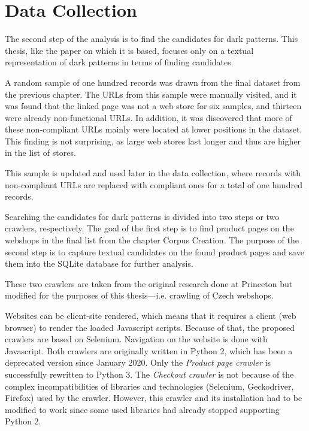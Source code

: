 \chapter{Data Collection}
    The second step of the analysis is to find the candidates for dark patterns. This thesis, like the paper on which it is based\cite{dark-patterns-at-scale}, focuses only on a textual representation of dark patterns in terms of finding candidates.

    A random sample of one hundred records was drawn from the final dataset from the previous chapter. The URLs from this sample were manually visited, and it was found that the linked page was not a web store for six samples, and thirteen were already non-functional URLs. In addition, it was discovered that more of these non-compliant URLs mainly were located at lower positions in the dataset. This finding is not surprising, as large web stores last longer and thus are higher in the list of stores.

    This sample is updated and used later in the data collection, where records with non-compliant URLs are replaced with compliant ones for a total of one hundred records.

    Searching the candidates for dark patterns is divided into two steps or two crawlers, respectively. The goal of the first step is to find product pages on the webshops in the final list from the chapter Corpus Creation. The purpose of the second step is to capture textual candidates on the found product pages and save them into the SQLite database for further analysis.

    These two crawlers are taken from the original research done at Princeton but modified for the purposes of this thesis---i.e. crawling of Czech webshops.

    Websites can be client-site rendered, which means that it requires a client (web browser) to render the loaded Javascript scripts. Because of that, the proposed crawlers are based on Selenium. Navigation on the website is done with Javascript.  Both crawlers are originally written in Python 2, which has been a deprecated version since January 2020. Only the \emph{Product page crawler} is successfully rewritten to Python 3. The \emph{Checkout crawler} is not because of the complex incompatibilities of libraries and technologies (Selenium, Geckodriver, Firefox) used by the crawler. However, this crawler and its installation had to be modified to work since some used libraries had already stopped supporting Python 2.


